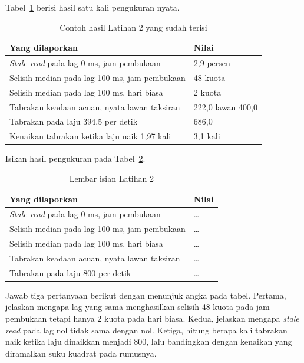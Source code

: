 Tabel~\ref{tab:lat2ruang-contoh} berisi hasil satu kali pengukuran nyata.

\begin{table}[htbp]
  \centering
  \caption{Contoh hasil Latihan 2 yang sudah terisi}
  \label{tab:lat2ruang-contoh}
  \begin{tabularx}{\textwidth}{|X|l|}
    \hline
    \textbf{Yang dilaporkan} & \textbf{Nilai} \\
    \hline
    \textit{Stale read} pada lag 0 ms, jam pembukaan & 2,9 persen \\
    \hline
    Selisih median pada lag 100 ms, jam pembukaan & 48 kuota \\
    \hline
    Selisih median pada lag 100 ms, hari biasa & 2 kuota \\
    \hline
    Tabrakan keadaan acuan, nyata lawan taksiran & 222,0 lawan 400,0 \\
    \hline
    Tabrakan pada laju 394,5 per detik & 686,0 \\
    \hline
    Kenaikan tabrakan ketika laju naik 1,97 kali & 3,1 kali \\
    \hline
  \end{tabularx}
\end{table}

Isikan hasil pengukuran pada Tabel~\ref{tab:lat2ruang-hasil}.

\begin{table}[htbp]
  \centering
  \caption{Lembar isian Latihan 2}
  \label{tab:lat2ruang-hasil}
  \begin{tabularx}{\textwidth}{|X|l|}
    \hline
    \textbf{Yang dilaporkan} & \textbf{Nilai} \\
    \hline
    \textit{Stale read} pada lag 0 ms, jam pembukaan & \dots \\
    \hline
    Selisih median pada lag 100 ms, jam pembukaan & \dots \\
    \hline
    Selisih median pada lag 100 ms, hari biasa & \dots \\
    \hline
    Tabrakan keadaan acuan, nyata lawan taksiran & \dots \\
    \hline
    Tabrakan pada laju 800 per detik & \dots \\
    \hline
  \end{tabularx}
\end{table}

Jawab tiga pertanyaan berikut dengan menunjuk angka pada tabel. Pertama,
jelaskan mengapa lag yang sama menghasilkan selisih 48 kuota pada jam
pembukaan tetapi hanya 2 kuota pada hari biasa. Kedua, jelaskan mengapa
\textit{stale read} pada lag nol tidak sama dengan nol. Ketiga, hitung berapa
kali tabrakan naik ketika laju dinaikkan menjadi 800, lalu bandingkan dengan
kenaikan yang diramalkan suku kuadrat pada rumusnya.

